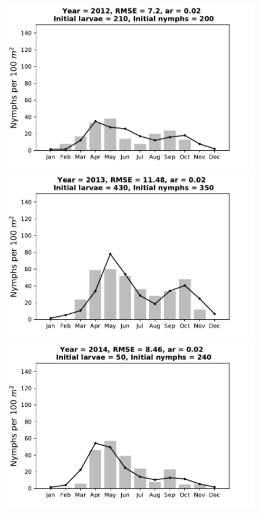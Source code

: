 \documentclass[a4paper, 11pt]{scrartcl}
\begin{document}
\begin{figure}[h!]
\begin{minipage}[c]{0.40\linewidth}
\end{minipage}
\begin{minipage}[c]{0.40\linewidth}
\includegraphics[width=\linewidth]{figures/s4/s4_2012}
\end{minipage}
\begin{minipage}[c]{0.40\linewidth}
\includegraphics[width=\linewidth]{figures/s4/s4_2013}
\end{minipage}
\begin{minipage}[c]{0.40\linewidth}
\includegraphics[width=\linewidth]{figures/s4/s4_2014}

\end{minipage}
\end{figure}
\end{document}
